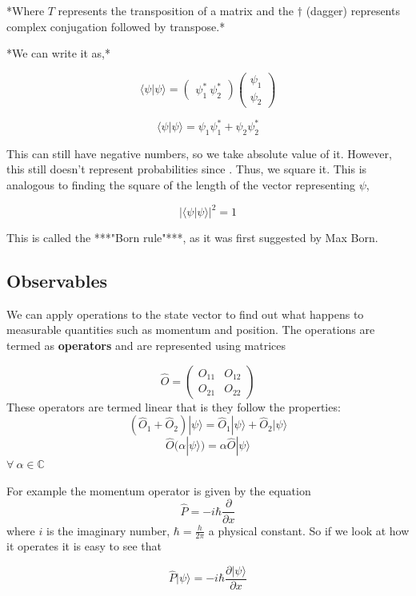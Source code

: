 \documentclass[]{article}
\begin{document}

*Where $T$ represents the transposition of a matrix and the $\dagger$ (dagger) represents complex conjugation followed by transpose.* 

*We can write it as,*

$$\langle \psi | \psi \rangle = \begin{pmatrix}
\psi^{*}_1 \ \psi^{*}_2
\end{pmatrix}\begin{pmatrix}
\psi_1 \\
\psi_2
\end{pmatrix}$$

$$\langle \psi | \psi \rangle = 
\psi_1 \psi^{*}_1 +  \psi_2\psi^{*}_2$$

This can still have negative numbers, so we take absolute value of it. However, this still doesn't represent probabilities since . Thus, we square it. This is analogous to finding the square of the length of the vector representing $\psi$,

$$|\langle \psi |\psi\rangle | ^{2} = 1$$

This is called the ***"Born rule"***, as it was first suggested by Max Born.

\subsection{Observables}

We can apply operations to the state vector to find out what happens to measurable quantities such as momentum and position. The operations are termed as \textbf{operators} and are represented using matrices

$$\hat{O} = \begin{pmatrix}
O_{11} & O_{12}\\
O_{21} & O_{22}
\end{pmatrix}$$
These operators are termed linear that is they follow the properties:
$$(\hat{O}_1 + \hat{O}_2)|\psi\rangle = \hat{O}_1|\psi\rangle+ \hat{O}_2 |\psi\rangle$$
$$\hat{O} (\alpha |\psi\rangle) = \alpha \hat{O} |\psi\rangle$$
$\forall \ \alpha \in \mathbb{C}$

For example the momentum operator is given by the equation
$$\hat{P} = -i \hbar \frac{\partial}{\partial x}$$
where $i$ is the imaginary number, $\hbar = \frac{h}{2 \pi}$ a physical constant. So if we look at how it operates it is easy to see that

$$\hat{P}|\psi\rangle = -i \hbar \frac{\partial | \psi \rangle}{\partial x}$$
\end{document}
